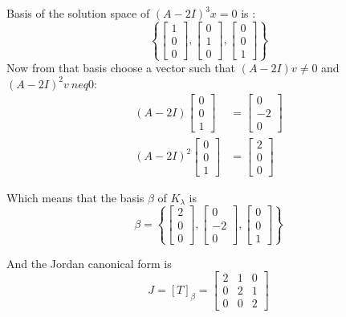 \begin{homeworkProblem}
Basis of the solution space of $(A-2I)^3 x = 0$ is :
\[
  \left\{
    \begin{bmatrix}
      1 \\ 0 \\ 0
    \end{bmatrix}, \begin{bmatrix}
      0 \\ 1 \\ 0
    \end{bmatrix}, \begin{bmatrix}
      0 \\ 0 \\ 1
    \end{bmatrix}
  \right\}
\]
Now from that basis choose a vector such that $(A-2I)v \neq 0$ and $(A-2I)^2 v\ neq 0$:
\[
  \begin{aligned}
    (A-2I)\begin{bmatrix}
      0 \\ 0 \\ 1
    \end{bmatrix} &= \begin{bmatrix}
      0 \\ -2 \\ 0
    \end{bmatrix} \\
    (A-2I)^2 \begin{bmatrix}
      0 \\ 0 \\ 1
    \end{bmatrix} &= \begin{bmatrix}
      2 \\ 0 \\ 0
      \end{bmatrix}
  \end{aligned}
\]

Which means that the basis $\beta$ of $K_\lambda$ is
\[
  \beta = \left\{
    \begin{bmatrix}
      2 \\ 0 \\ 0
    \end{bmatrix},
    \begin{bmatrix}
      0 \\ -2 \\ 0
    \end{bmatrix},
    \begin{bmatrix}
      0 \\ 0 \\ 1
    \end{bmatrix}
  \right\}
\]

And the Jordan canonical form is
\[
  J = [T]_\beta = \begin{bmatrix}
    2 & 1 & 0\\
    0 & 2 & 1\\
    0 & 0 & 2
  \end{bmatrix}
\]

\end{homeworkProblem}
